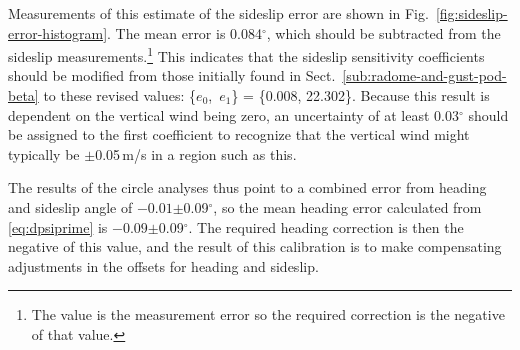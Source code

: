 \documentclass[12pt,twoside,english]{article}\usepackage[]{graphicx}\usepackage[]{color}
\let\OrgIndex\index
\renewcommand*{\index}[1]{\OrgIndex{#1}}
\begin{document}
{{Measurements of this estimate of the sideslip error are shown in Fig.~\ref{fig:sideslip-error-histogram}. The mean error is 0.084$^{\circ}$, which  should be subtracted from the sideslip measurements.\footnote{The value is the measurement error so the required correction is the negative of that value.} 
This indicates that the sideslip sensitivity coefficients should be modified from those initially found in Sect.~\ref{sub:radome-and-gust-pod-beta} to these revised values:\label{page:SSoffset} \{$e_{0}$,\, $e_{1}$\} = \{0.008, 22.302\}. Because this result is dependent on the vertical wind being zero, an uncertainty of at least 0.03$^{\circ}$ should be assigned to the first coefficient to recognize that the vertical wind might typically be $\pm$0.05\,m/s in a region such as this.%

The results of the circle analyses thus point to a combined error from heading and sideslip angle of %
\ensuremath{-0.01}$\pm$0.09$^{\circ}$, so the mean heading error  calculated from \eqref{eq:dpsiprime} is 
\ensuremath{-0.09}$\pm$0.09$^{\circ}$. 
The required heading correction is then the negative of this value, and the result of this calibration is to make compensating adjustments in the offsets for heading and sideslip. 

% 



}}
\end{document}
